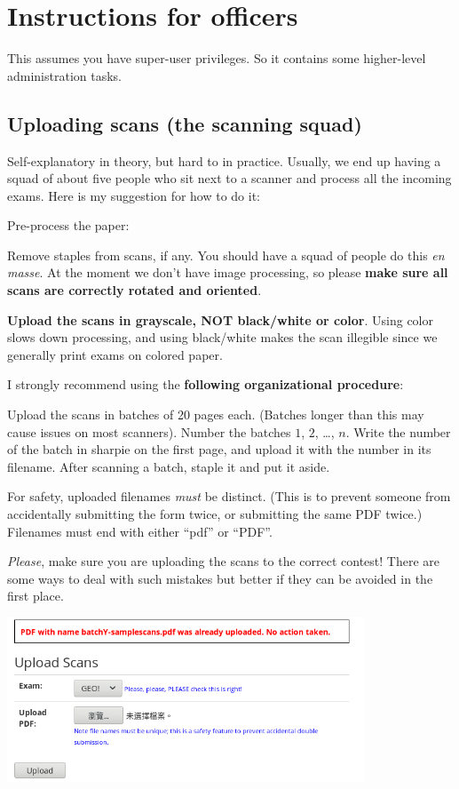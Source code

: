 \chapter{Instructions for officers}
This assumes you have super-user privileges.
So it contains some higher-level administration tasks.

\section{Uploading scans (the scanning squad)}
Self-explanatory in theory, but hard to in practice.
Usually, we end up having a squad of about five people
who sit next to a scanner and process all the incoming exams.
Here is my suggestion for how to do it:
\begin{itemize}
	\ii Pre-process the paper:
	\begin{itemize}
		\ii Remove staples from scans, if any.
		You should have a squad of people do this \emph{en masse}.
		\ii At the moment we don't have image processing,
		so please \textbf{make sure all scans are correctly rotated and oriented}.
	\end{itemize}

	\ii \textbf{\color{red} Upload the scans in grayscale, NOT black/white or color}.
	Using color slows down processing, and using black/white makes the scan
	illegible since we generally print exams on colored paper.

	\ii I strongly recommend using the \textbf{following organizational procedure}:
	\begin{itemize}
		\ii Upload the scans in batches of 20 pages each.
		(Batches longer than this may cause issues on most scanners).
		\ii Number the batches $1$, $2$, \dots, $n$.
		Write the number of the batch in sharpie on the first page,
		and upload it with the number in its filename.
		\ii After scanning a batch, staple it and put it aside.
	\end{itemize}

	\ii For safety, uploaded filenames \emph{must} be distinct.
	(This is to prevent someone from accidentally submitting the form twice,
	or submitting the same PDF twice.)
	Filenames must end with either ``pdf'' or ``PDF''.

	\ii \emph{Please}, make sure you are uploading the scans
	to the correct contest!
	There are some ways to deal with such mistakes but better
	if they can be avoided in the first place.
\end{itemize}

\begin{center}
	\includegraphics[width=0.8\textwidth]{images/batchscan.png}
\end{center}

